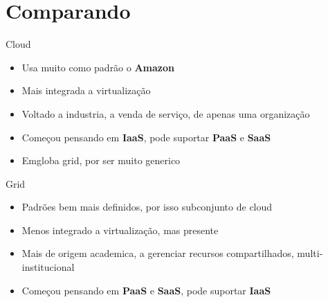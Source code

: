 \documentclass[10pt]{beamer}
\begin{document}
\section{Comparando}
	\begin{frame}%
	\begin{block}{Cloud}
		\begin{itemize}%
			\item Usa muito como padrão o \textbf{Amazon}
			\item Mais integrada a virtualização
			\item Voltado a industria, a venda de serviço, de apenas uma organização
			\item Começou pensando em \textbf{IaaS}, pode suportar \textbf{PaaS} e \textbf{SaaS}
			\item Emgloba grid, por ser muito generico
		\end{itemize}
	\end{block}

	\begin{block}{Grid}
		\begin{itemize}%
			\item Padrões bem mais definidos, por isso subconjunto de cloud
			\item Menos integrado a virtualização, mas presente
			\item Mais de origem academica, a gerenciar recursos compartilhados, multi-institucional
			\item Começou pensando em \textbf{PaaS} e \textbf{SaaS}, pode suportar \textbf{IaaS}
		\end{itemize}
	\end{block}
	\end{frame}
\end{document}
